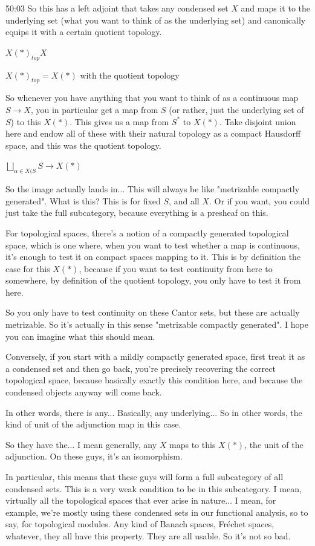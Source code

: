 \begin{unfinished}{50:03}
So this has a left adjoint that takes any condensed set $X$ and maps it to the underlying set (what you want to think of as the underlying set) and canonically equips it with a certain quotient topology.

$ X(\ast)_{top} X$

$ X(\ast)_{top} = X(\ast) $
with the quotient topology 

So whenever you have anything that you want to think of as a continuous map $S \to X$, you in particular get a map from $S$ (or rather, just the underlying set of $S$) to this $X(\ast)$. This gives us a map from $S^\ast$ to $X(\ast)$. Take disjoint union here and endow all of these with their natural topology as a compact Hausdorff space, and this was the quotient topology.

$ \bigsqcup_{\alpha \in X(S} S \to X(\ast)$

So the image actually lands in... This will always be like "metrizable compactly generated". What is this? This is for fixed $S$, and all $X$. Or if you want, you could just take the full subcategory, because everything is a presheaf on this.

For topological spaces, there's a notion of a compactly generated topological space, which is one where, when you want to test whether a map is continuous, it's enough to test it on compact spaces mapping to it. This is by definition the case for this $X(\ast)$, because if you want to test continuity from here to somewhere, by definition of the quotient topology, you only have to test it from here.

So you only have to test continuity on these Cantor sets, but these are actually metrizable. So it's actually in this sense "metrizable compactly generated". I hope you can imagine what this should mean.

Conversely, if you start with a mildly compactly generated space, first treat it as a condensed set and then go back, you're precisely recovering the correct topological space, because basically exactly this condition here, and because the condensed objects anyway will come back.

In other words, there is any... Basically, any underlying... So in other words, the kind of unit of the adjunction map in this case.

So they have the... I mean generally, any $X$ maps to this $X(\ast)$, the unit of the adjunction. On these guys, it's an isomorphism.

In particular, this means that these guys will form a full subcategory of all condensed sets. This is a very weak condition to be in this subcategory. I mean, virtually all the topological spaces that ever arise in nature... I mean, for example, we're mostly using these condensed sets in our functional analysis, so to say, for topological modules. Any kind of Banach spaces, Fréchet spaces, whatever, they all have this property. They are all usable. So it's not so bad.



\end{unfinished}
